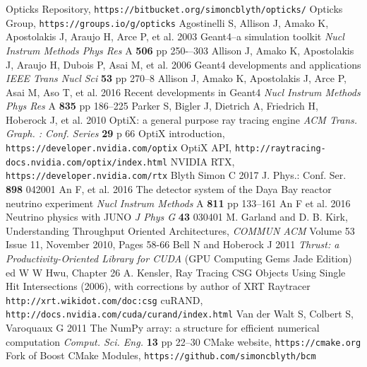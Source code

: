 \documentclass{webofc}
\begin{document}
\begin{thebibliography}{}
%
Opticks Repository, {\tt https://bitbucket.org/simoncblyth/opticks/}
Opticks Group, {\tt https://groups.io/g/opticks}
Agostinelli S, Allison J, Amako K, Apostolakis J, Araujo H, Arce P, et al.
2003
Geant4--a simulation toolkit
{\it Nucl Instrum Methods Phys Res} A {\bf 506} pp 250-–303
Allison J, Amako K, Apostolakis J, Araujo H, Dubois P, Asai M, et al.
2006
Geant4 developments and applications
{\it IEEE Trans Nucl Sci} {\bf 53} pp 270--8
Allison J, Amako K, Apostolakis J, Arce P, Asai M, Aso T, et al.
2016
Recent developments in Geant4
{\it Nucl Instrum Methods Phys Res} A {\bf 835} pp 186--225
Parker S, Bigler J, Dietrich A, Friedrich H, Hoberock J, et al.
2010
OptiX: a general purpose ray tracing engine
{\it ACM Trans. Graph. : Conf. Series} {\bf 29} p 66
OptiX introduction, {\tt https://developer.nvidia.com/optix}
OptiX API, {\tt http://raytracing-docs.nvidia.com/optix/index.html}
NVIDIA RTX, {\tt https://developer.nvidia.com/rtx}
Blyth Simon C 2017 J. Phys.: Conf. Ser. {\bf 898} 042001
An F, et al.
2016
The detector system of the Daya Bay reactor neutrino experiment
{\it Nucl Instrum Methods} A {\bf 811} pp 133--161
An F et al.
2016
Neutrino physics with JUNO
{\it J Phys G} {\bf 43} 030401
M. Garland and D. B. Kirk, Understanding Throughput Oriented Architectures, 
{\it COMMUN ACM} Volume 53 Issue 11, November 2010, Pages 58-66  	
Bell N and Hoberock J 
2011
{\it Thrust: a Productivity-Oriented Library for CUDA}
(GPU Computing Gems Jade Edition) ed W W Hwu, Chapter 26
A. Kensler, Ray Tracing CSG Objects Using Single Hit Intersections (2006), 
with corrections by author of XRT Raytracer {\tt http://xrt.wikidot.com/doc:csg}
cuRAND, {\tt http://docs.nvidia.com/cuda/curand/index.html}
Van der Walt S, Colbert S, Varoquaux G 
2011 
The NumPy array: a structure for efficient numerical computation
{\it Comput. Sci. Eng.} {\bf 13} pp 22--30
CMake website, {\tt https://cmake.org}
Fork of Boost CMake Modules,  {\tt https://github.com/simoncblyth/bcm}
%
\end{thebibliography}
\end{document}
